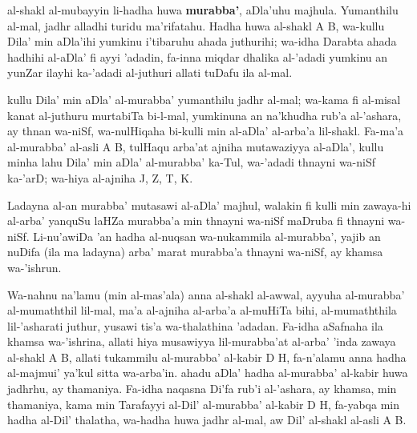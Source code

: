 \documentclass[11pt,a4paper]{book}
\begin{document}
\begin{originaltext}
al-shakl al-mubayyin li-hadha huwa \textbf{murabba'}, aDla'uhu
majhula. Yumanthilu al-mal, jadhr alladhi turidu ma'rifatahu. Hadha
huwa al-shakl A B, wa-kullu Dila' min aDla'ihi yumkinu i'tibaruhu
ahada juthurihi; wa-idha Darabta ahada hadhihi al-aDla' fi ayyi
'adadin, fa-inna miqdar dhalika al-'adadi yumkinu an yunZar ilayhi
ka-'adadi al-juthuri allati tuDafu ila al-mal.

kullu Dila' min aDla' al-murabba' yumanthilu jadhr al-mal; wa-kama
fi al-misal kanat al-juthuru murtabiTa bi-l-mal, yumkinuna an
na'khudha rub'a al-'ashara, ay thnan wa-niSf, wa-nulHiqaha bi-kulli
min al-aDla' al-arba'a lil-shakl. Fa-ma'a al-murabba' al-asli A B,
tulHaqu arba'at ajniha mutawaziyya al-aDla', kullu minha lahu Dila'
min aDla' al-murabba' ka-Tul, wa-'adadi thnayni wa-niSf ka-'arD;
wa-hiya al-ajniha J, Z, T, K.

Ladayna al-an murabba' mutasawi al-aDla' majhul, walakin fi kulli
min zawaya-hi al-arba' yanquSu laHZa murabba'a min thnayni wa-niSf
maDruba fi thnayni wa-niSf. Li-nu'awiDa 'an hadha al-nuqsan
wa-nukammila al-murabba', yajib an nuDifa (ila ma ladayna) arba'
marat murabba'a thnayni wa-niSf, ay khamsa wa-'ishrun.

Wa-nahnu na'lamu (min al-mas'ala) anna al-shakl al-awwal, ayyuha
al-murabba' al-mumaththil lil-mal, ma'a al-ajniha al-arba'a al-muHiTa
bihi, al-mumaththila lil-'asharati juthur, yusawi tis'a wa-thalathina
'adadan. Fa-idha aSafnaha ila khamsa wa-'ishrina, allati hiya
musawiyya lil-murabba'at al-arba' 'inda zawaya al-shakl A B, allati
tukammilu al-murabba' al-kabir D H, fa-n'alamu anna hadha al-majmui'
ya'kul sitta wa-arba'in. ahadu aDla' hadha al-murabba' al-kabir huwa
jadhrhu, ay thamaniya. Fa-idha naqasna Di'fa rub'i al-'ashara, ay
khamsa, min thamaniya, kama min Tarafayyi al-Dil' al-murabba' al-kabir
D H, fa-yabqa min hadha al-Dil' thalatha, wa-hadha huwa jadhr
al-mal, aw Dil' al-shakl al-asli A B.
\end{originaltext}
\end{document}
